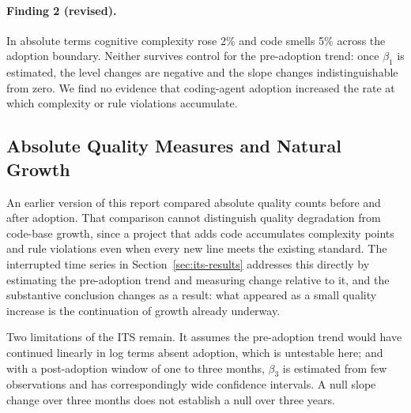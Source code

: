 \paragraph{Finding 2 (revised).} In absolute terms cognitive complexity rose
2\% and code smells 5\% across the adoption boundary. Neither survives control
for the pre-adoption trend: once $\beta_1$ is estimated, the level changes are
negative and the slope changes indistinguishable from zero. We find no evidence
that coding-agent adoption increased the rate at which complexity or rule
violations accumulate.


\subsection{Absolute Quality Measures and Natural Growth}
\label{sec:threats-absolute}

An earlier version of this report compared absolute quality counts before and
after adoption. That comparison cannot distinguish quality degradation from
code-base growth, since a project that adds code accumulates complexity points
and rule violations even when every new line meets the existing standard. The
interrupted time series in Section~\ref{sec:its-results} addresses this
directly by estimating the pre-adoption trend and measuring change relative to
it, and the substantive conclusion changes as a result: what appeared as a
small quality increase is the continuation of growth already underway.

Two limitations of the ITS remain. It assumes the pre-adoption trend would have
continued linearly in log terms absent adoption, which is untestable here;
and with a post-adoption window of one to three months, $\beta_3$ is estimated
from few observations and has correspondingly wide confidence intervals. A
null slope change over three months does not establish a null over three years.


